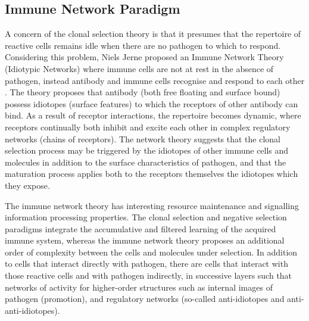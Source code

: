 \subsection{Immune Network Paradigm}
\label{subsec:background:immunenetwork}
A concern of the clonal selection theory is that it presumes that the repertoire of reactive cells remains idle when there are no pathogen to which to respond. Considering this problem, Niels Jerne proposed an Immune Network Theory (Idiotypic Networks) where immune cells are not at rest in the absence of pathogen, instead antibody and immune cells recognise and respond to each other \cite{Jerne1974a, Jerne1974, Jerne1984}. The theory proposes that antibody (both free floating and surface bound) possess idiotopes (surface features) to which the receptors of other antibody can bind. As a result of receptor interactions, the repertoire becomes dynamic, where receptors continually both inhibit and excite each other in complex regulatory networks (chains of receptors). The network theory suggests that the clonal selection process may be triggered by the idiotopes of other immune cells and molecules in addition to the surface characteristics of pathogen, and that the maturation process applies both to the receptors themselves the idiotopes which they expose. 

The immune network theory has interesting resource maintenance and signalling information processing properties. The clonal selection and negative selection paradigms integrate the accumulative and filtered learning of the acquired immune system, whereas the immune network theory proposes an additional order of complexity between the cells and molecules under selection. In addition to cells that interact directly with pathogen, there are cells that interact with those reactive cells and with pathogen indirectly, in successive layers such that networks of activity for higher-order structures such as internal images of pathogen (promotion), and regulatory networks (so-called anti-idiotopes and anti-anti-idiotopes).

